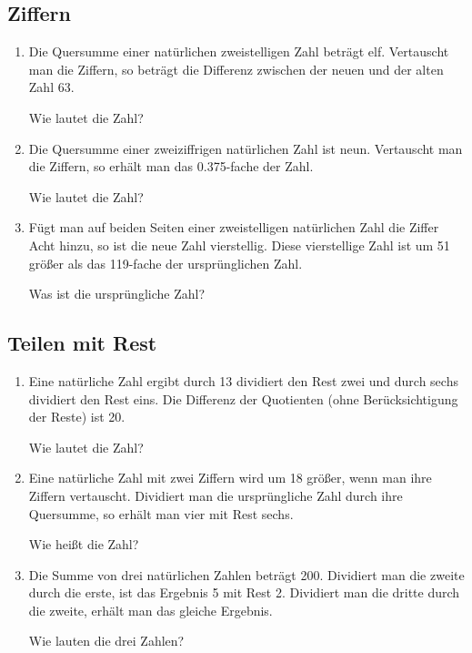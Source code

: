 \subsection{Ziffern}
\begin{enumerate}[label=\alph*)]
\item Die Quersumme einer natürlichen zweistelligen Zahl beträgt
elf. Vertauscht man die Ziffern, so beträgt die Differenz zwischen der
neuen und der alten Zahl 63.

Wie lautet die Zahl?

\item
Die Quersumme einer zweiziffrigen natürlichen Zahl ist neun.
Vertauscht man die Ziffern, so erhält man das 0.375-fache der Zahl.

Wie lautet die Zahl?


\item
Fügt man auf beiden Seiten einer zweistelligen natürlichen Zahl
die Ziffer Acht hinzu, so ist die neue Zahl vierstellig. Diese
vierstellige Zahl ist um 51 größer als das 119-fache der ursprünglichen
Zahl.

Was ist die ursprüngliche Zahl?

\end{enumerate}
\newpage
\subsection{Teilen mit Rest}

\begin{enumerate}[label=\alph*)]
\item
Eine natürliche Zahl ergibt durch 13 dividiert den Rest zwei und durch sechs
dividiert den Rest eins. Die Differenz der Quotienten (ohne
Berücksichtigung der Reste) ist 20.

Wie lautet die Zahl?

\item
Eine natürliche Zahl mit zwei Ziffern wird um 18 größer, wenn man ihre
Ziffern vertauscht. Dividiert man die ursprüngliche Zahl durch ihre
Quersumme, so erhält man vier mit Rest sechs.

Wie heißt die Zahl?

\item
Die Summe von drei natürlichen Zahlen beträgt 200. Dividiert man die
zweite durch die erste, ist das Ergebnis 5 mit Rest 2. Dividiert man
die dritte durch die zweite, erhält man das gleiche Ergebnis.

Wie lauten die drei Zahlen?


\end{enumerate}
\newpage
